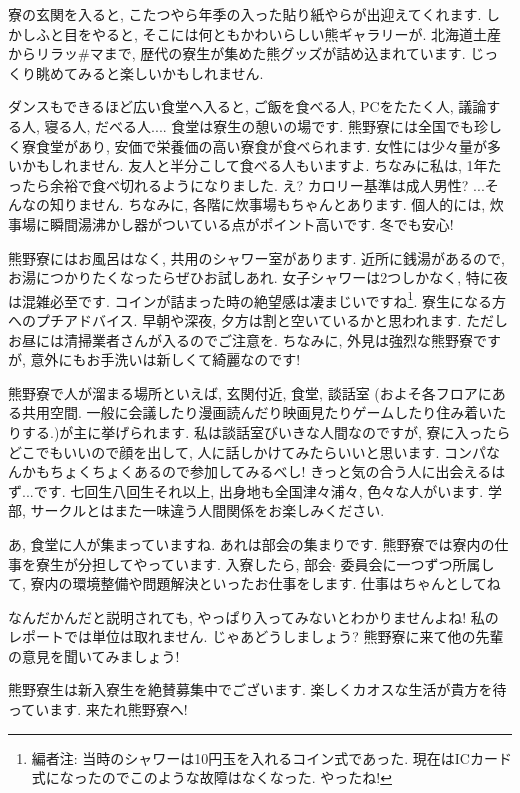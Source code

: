 \documentclass[10pt,b5jsbook,dvips,dvipdfmx,openany]{jsbook}
\theoremstyle{definition}
\begin{document}
		寮の玄関を入ると, こたつやら年季の入った貼り紙やらが出迎えてくれます. しかしふと目をやると, そこには何ともかわいらしい熊ギャラリーが. 北海道土産からリラッ\#マまで, 歴代の寮生が集めた熊グッズが詰め込まれています. じっくり眺めてみると楽しいかもしれません. 

		ダンスもできるほど広い食堂へ入ると, ご飯を食べる人, PCをたたく人, 議論する人, 寝る人, だべる人.... 食堂は寮生の憩いの場です. 熊野寮には全国でも珍しく寮食堂があり, 安価で栄養価の高い寮食が食べられます. 女性には少々量が多いかもしれません. 友人と半分こして食べる人もいますよ. ちなみに私は, 1年たったら余裕で食べ切れるようになりました. え? カロリー基準は成人男性? ...そんなの知りません. ちなみに, 各階に炊事場もちゃんとあります. 個人的には, 炊事場に瞬間湯沸かし器がついている点がポイント高いです. 冬でも安心! 

		熊野寮にはお風呂はなく, 共用のシャワー室があります. 近所に銭湯があるので, お湯につかりたくなったらぜひお試しあれ. 女子シャワーは2つしかなく, 特に夜は混雑必至です. コインが詰まった時の絶望感は凄まじいですね\footnote{編者注: 当時のシャワーは10円玉を入れるコイン式であった. 現在はICカード式になったのでこのような故障はなくなった. やったね!}. 寮生になる方へのプチアドバイス. 早朝や深夜, 夕方は割と空いているかと思われます. ただしお昼には清掃業者さんが入るのでご注意を. ちなみに, 外見は強烈な熊野寮ですが, 意外にもお手洗いは新しくて綺麗なのです! 

		熊野寮で人が溜まる場所といえば, 玄関付近, 食堂, 談話室 (およそ各フロアにある共用空間. 一般に会議したり漫画読んだり映画見たりゲームしたり住み着いたりする.)が主に挙げられます. 私は談話室びいきな人間なのですが, 寮に入ったらどこでもいいので顔を出して, 人に話しかけてみたらいいと思います. コンパなんかもちょくちょくあるので参加してみるべし!  きっと気の合う人に出会えるはず...です. 七回生八回生それ以上, 出身地も全国津々浦々, 色々な人がいます. 学部, サークルとはまた一味違う人間関係をお楽しみください. 

		あ, 食堂に人が集まっていますね. あれは部会の集まりです. 熊野寮では寮内の仕事を寮生が分担してやっています. 入寮したら, 部会$ \cdot $ 委員会に一つずつ所属して, 寮内の環境整備や問題解決といったお仕事をします. 仕事はちゃんとしてね

		なんだかんだと説明されても, やっぱり入ってみないとわかりませんよね!  私のレポートでは単位は取れません. じゃあどうしましょう?  熊野寮に来て他の先輩の意見を聞いてみましょう! 

		熊野寮生は新入寮生を絶賛募集中でございます. 楽しくカオスな生活が貴方を待っています. 来たれ熊野寮へ! 
\end{document}
